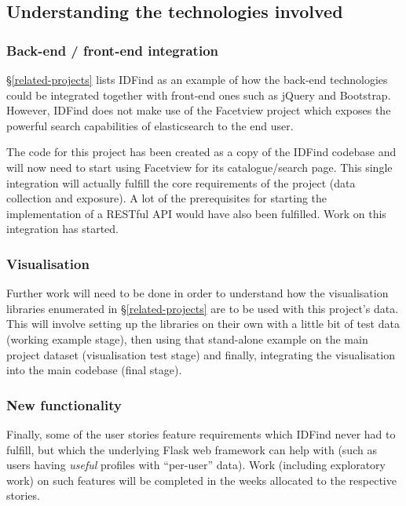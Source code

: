 \documentclass[11pt,fleqn,twoside]{article}
\begin{document}
\subsection{Understanding the technologies involved}

\subsubsection{Back-end / front-end integration}
\S\ref{related-projects} lists IDFind as an example of how the back-end technologies could be integrated together with front-end ones such as jQuery and Bootstrap. However, IDFind does not make use of the Facetview project which exposes the powerful search capabilities of elasticsearch to the end user.

The code for this project has been created as a copy of the IDFind codebase and will now need to start using Facetview for its catalogue/search page. This single integration will actually fulfill the core requirements of the project (data collection and exposure). A lot of the prerequisites for starting the implementation of a RESTful API would have also been fulfilled. Work on this integration has started.

\subsubsection{Visualisation}
Further work will need to be done in order to understand how the visualisation libraries enumerated in \S\ref{related-projects} are to be used with this project's data. This will involve setting up the libraries on their own with a little bit of test data (working example stage), then using that stand-alone example on the main project dataset (visualisation test stage) and finally, integrating the visualisation into the main codebase (final stage).

\subsubsection{New functionality}
Finally, some of the user stories feature requirements which IDFind never had to fulfill, but which the underlying Flask \cite{flask} web framework can help with (such as users having \emph{useful} profiles with ``per-user'' data). Work (including exploratory work) on such features will be completed in the weeks allocated to the respective stories.
\end{document}
